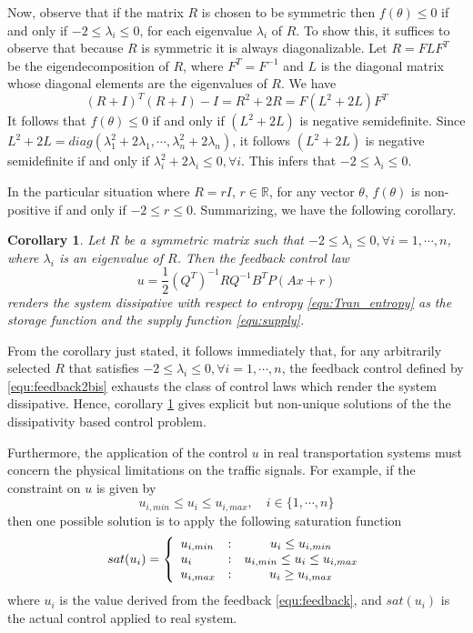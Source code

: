 \documentclass[trsc,nonblindrev]{informs3} %
\renewcommand{\vec}[1]{#1}
\newcommand{\mat}[1]{#1}
\newtheorem{cor}{Corollary}
\begin{document}
Now, observe that if the matrix $R$ is chosen to be symmetric then $f(\theta)\leq 0$ if and only if $-2\leq\lambda_i\leq 0$, for each  eigenvalue $\lambda_i$  
 of $R$. To show this, it suffices to observe that because $R$ is symmetric it is always diagonalizable. Let $R=FLF^T$ be the eigendecomposition of $R$, where $F^T=F^{-1}$ and $L$ is the diagonal matrix whose diagonal elements are the  eigenvalues of $R$. We have 
 $$(R+I)^T(R+I)-I=R^2+2R=F(L^2+2L)F^T$$
It follows that $f(\theta)\leq 0$ if and only if $(L^2+2L)$ is negative semidefinite. Since $L^2+2L=diag(\lambda_1^2+2\lambda_1,\cdots,\lambda_n^2+2\lambda_n)$, it follows $(L^2+2L)$ is negative semidefinite if and only if  $\lambda_i^2+2\lambda_i \leq 0, \forall i $. This infers that  $-2\leq\lambda_i\leq 0$.

In the particular situation where $\mat{R}=r\mat{I}$, $r\in
\mathbb{R}$,
for any vector $\vec{\theta}$, $f(\vec{\theta})$ is non-positive if and only if $-2\leq r\leq 0$. Summarizing, we have the following corollary. 

\begin{cor}\label{thm:pbcc2} Let $R$ be a symmetric matrix such that $-2\leq\lambda_i\leq 0,  \forall
i=1,\cdots,n$, where $\lambda_i$ is an eigenvalue of $R$. Then 
 the feedback control law
\begin{equation}
\label{equ:feedback2bis}
\vec{u}=\frac{1}{2}(\mat{Q}^T)^{-1}\mat{R}\mat{Q}^{-1}\mat{B}^T\mat{P}(\mat{A}
\vec{x}+\vec{r})
\end{equation}
renders the system dissipative with respect to
entropy \eqref{equ:Tran_entropy} as the storage function and the
supply function \eqref{equ:supply}.
 
\end{cor}

From the corollary just stated,  it follows immediately that, for any
arbitrarily selected $R$ that satisfies $-2\leq\lambda_i\leq 0,  \forall i=1,\cdots,n$, the feedback
control defined by \eqref{equ:feedback2bis} exhausts the class of control laws
which render the system dissipative. Hence, corollary \ref{thm:pbcc2} 
gives explicit but non-unique solutions of the the dissipativity based
control problem.

Furthermore, the application of the control $\vec{u}$ in real
transportation systems must concern the physical limitations on the
traffic signals. For example, if the constraint on $\vec{u}$ is given
by
$$u_{i,min}\le u_i\le u_{i,max},\quad i\in\{1,\cdots,n\}
$$
then one possible solution is to apply the following saturation
function
\begin{equation}
sat(u_i) = \left\{ \begin{array}{l@{\quad:\quad}c}
        u_{i,min} & u_i\le u_{i,min}\\
        u_i & u_{i,min}\le u_i\le u_{i,max}\\
        u_{i,max} & u_i\ge u_{i,max}
        \end{array}\right.
\end{equation}
where $u_i$ is the value derived from the feedback
\eqref{equ:feedback}, and $sat(u_i)$ is the actual control applied
to real system.
\end{document}

